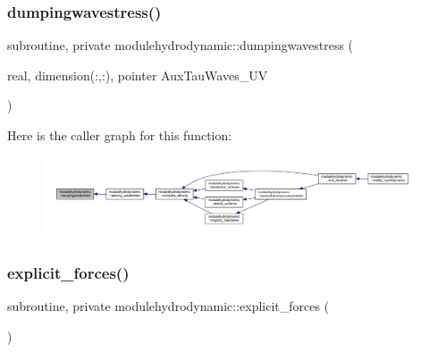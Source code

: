 \mbox{\label{namespacemodulehydrodynamic_ab02a05bbd39bd69a28f6f8f585e49eb4}} 
\subsubsection{\texorpdfstring{dumpingwavestress()}{dumpingwavestress()}}
{\footnotesize\ttfamily subroutine, private modulehydrodynamic\+::dumpingwavestress (\begin{DoxyParamCaption}\item[{real, dimension(\+:,\+:), pointer}]{Aux\+Tau\+Waves\+\_\+\+UV }\end{DoxyParamCaption})\hspace{0.3cm}{\ttfamily [private]}}

Here is the caller graph for this function\+:\nopagebreak
\begin{figure}[H]
\begin{center}
\leavevmode
\includegraphics[width=350pt]{namespacemodulehydrodynamic_ab02a05bbd39bd69a28f6f8f585e49eb4_icgraph}
\end{center}
\end{figure}
\mbox{\label{namespacemodulehydrodynamic_a789f1e7896025efc57bee4107cc31422}} 
\subsubsection{\texorpdfstring{explicit\+\_\+forces()}{explicit\_forces()}}
{\footnotesize\ttfamily subroutine, private modulehydrodynamic\+::explicit\+\_\+forces (\begin{DoxyParamCaption}{ }\end{DoxyParamCaption})\hspace{0.3cm}{\ttfamily [private]}}

